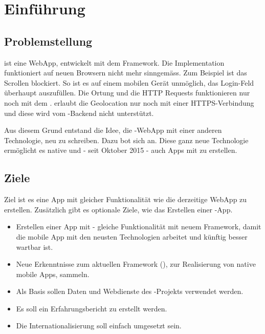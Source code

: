 \chapter{Einführung}
\label{tb-einfuehrung}

\section{Problemstellung}
\kort{} ist eine \gls{WebApp}, entwickelt mit dem  \gls{Framework}.
Die Implementation funktioniert auf neuen Browsern nicht mehr sinngemäss.
Zum Beispiel ist das Scrollen blockiert.
So ist es auf einem mobilen Gerät unmöglich, das Login-Feld überhaupt auszufüllen.
Die Ortung und die HTTP Requests funktionieren nur noch mit dem .
 erlaubt die Geolocation nur noch mit einer HTTPS-Verbindung und diese wird vom \kort{}-Backend nicht unterstützt.

Aus diesem Grund entstand die Idee, die \kort{}-\gls{WebApp} mit einer anderen Technologie, neu zu schreiben.
Dazu bot sich  an. 
Diese ganz neue Technologie ermöglicht es native  und - seit Oktober 2015 - auch  Apps mit  zu erstellen. 


\section{Ziele}
\label{tb-einfuehrung-ziele}
Ziel ist es eine  App mit gleicher Funktionalität wie die derzeitige \gls{WebApp} zu erstellen.
Zusätzlich gibt es optionale Ziele, wie das Erstellen einer -App.

\begin{itemize}
	\item Erstellen einer  App mit  - gleiche Funktionalität mit neuem Framework, damit die mobile App mit den neusten Technologien arbeitet und künftig besser wartbar ist.
	\item Neue Erkenntnisse zum aktuellen Framework (), zur Realisierung von native mobile Apps, sammeln.
	\item Als Basis sollen Daten und Webdienste des -Projekts verwendet werden.
	\item Es soll ein Erfahrungsbericht zu  erstellt werden.
	\item Die Internationalisierung soll einfach umgesetzt sein.
\end{itemize}


